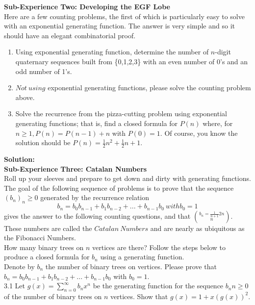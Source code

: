 \documentclass[10pt,a4paper]{report}
\begin{document}
	\textbf{Sub-Experience Two: Developing the EGF Lobe}\\
	Here are a few counting problems, the first of which is particularly easy to solve with an exponential generating function.  The answer is very simple and so it should have an elegant combinatorial proof.
	\begin{enumerate}
		\item Using exponential generating function, determine the number of $n$-digit quaternary sequences built from \{0,1,2,3\} with an even number of 0's and an odd number of 1's.
		\item $Not\ using$ exponential generating functions, please solve the counting problem above.
		\item Solve the recurrence from the pizza-cutting problem using exponential generating functions; that is, find a closed formula for $P(n)$ where, for $n\geq1, P(n) = P(n-1) + n$ with $P(0) = 1$.  Of course, you know the solution should be $P(n) = \frac{1}{2}n^2 + \frac{1}{2}n + 1$.
	\end{enumerate}
	\textbf{Solution: }\\
	\newline
	\textbf{Sub-Experience Three: Catalan Numbers}\\
	Roll up your sleeves and prepare to get down and dirty with generating functions.  The goal of the following sequence of problems is to prove that the sequence $(b_n)_n\geq0$ generated by the recurrence relation\\
	\[b_n = b_0b_{n-1} + b_1b_{n-2} + ... + b_{n-1}b_0\ with b_0 = 1\]
	gives the answer to the following counting questions, and that $b_n = \frac{1}{n+1}{2n}\choose{n}$.  These numbers are called the $Catalan\ Numbers$ and are nearly as ubiquitous as the Fibonacci Numbers.\\
	\newline
	How many binary trees on $n$ vertices are there?  Follow the steps below to produce a closed formula for $b_n$ using a generating function.\\
	 Denote by $b_n$ the number of binary trees on vertices.  Please prove that $b_n = b_0b_{n-1} + b_1b_{n-2} + ... + b_{n-1}b_0$ with $b_0 = 1$.\\
	3.1 Let $g(x) = \sum_{n=0}^{\infty}b_nx^n$ be the generating function for the sequence $b_n n\geq0$ of the number of binary trees on $n$ vertices.  Show that $g(x) = 1+x(g(x))^2$.\\
\end{document}
